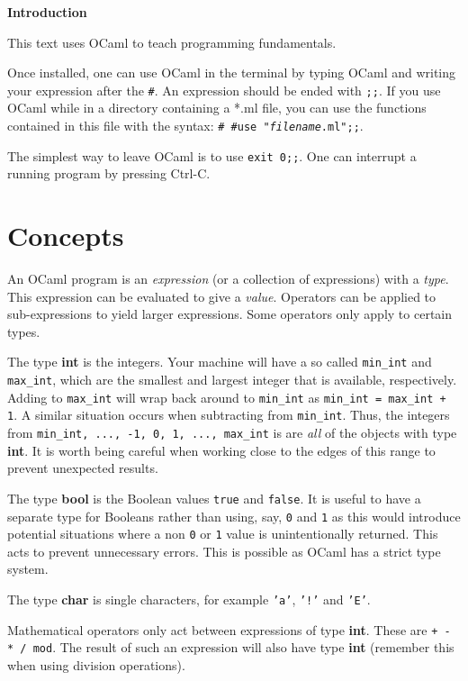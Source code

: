 \documentclass[12pt]{article}
\begin{document}
\begin{center}\LARGE\bf
    Introduction
\end{center}

This text uses OCaml to teach programming fundamentals.

Once installed, one can use OCaml in the terminal by typing OCaml and writing your expression
after the \texttt{\#}. An expression should be ended with \texttt{;;}. If you use OCaml while in a
directory containing a *.ml file, you can use the functions contained in this file with the syntax:
\texttt{# #use "\textit{filename}.ml";;}.

The simplest way to leave OCaml is to use \texttt{exit 0;;}. One can interrupt a running program by
pressing Ctrl-C.

\section{Concepts}
An OCaml program is an \textit{expression} (or a collection of expressions) with a \textit{type}.
This expression can be evaluated to give a \textit{value}. Operators can be applied to sub-expressions
to yield larger expressions. Some operators only apply to certain types.

The type \textbf{int} is the integers. Your machine will have a so called \texttt{min\_int} and \texttt{max\_int}, which
are the smallest and largest integer that is available, respectively. Adding to \texttt{max\_int} will
wrap back around to \texttt{min\_int} as \texttt{min\_int = max\_int + 1}. A similar situation occurs when
subtracting from \texttt{min\_int}. Thus, the integers from \texttt{min\_int, ..., -1, 0, 1, ..., max\_int} is
are \textit{all} of the objects with type \textbf{int}. It is worth being careful when working close to the edges of this range
to prevent unexpected results.

The type \textbf{bool} is the Boolean values \texttt{true} and \texttt{false}. It is useful to have
a separate type for Booleans rather than using, say, \texttt{0} and \texttt{1} as this would introduce
potential situations where a non \texttt{0} or \texttt{1} value is unintentionally returned. This acts
to prevent unnecessary errors. This is possible as OCaml has a strict type system.

The type \textbf{char} is single characters, for example \texttt{'a'}, \texttt{'!'} and \texttt{'E'}.

Mathematical operators only act between expressions of type \textbf{int}. These are \texttt{+ - * / mod}.
The result of such an expression will also have type \textbf{int} (remember this when using division operations).
\end{document}
